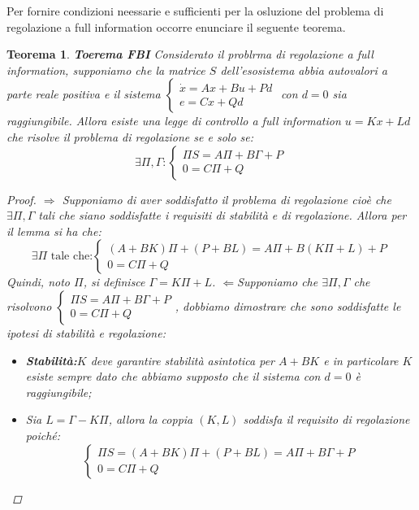 \documentclass{article}
\newtheorem{theorem}{\textbf{Teorema}}
\theoremstyle{definition}
\begin{document}
Per fornire condizioni neessarie e sufficienti per la osluzione del problema di regolazione a full information occorre enunciare il seguente teorema.
\begin{theorem}{\textbf{Toerema FBI}}
    Considerato il problrma di regolazione a full information, supponiamo che la matrice \(S\) dell'esosistema abbia autovalori a parte reale positiva e il sistema \(\begin{cases}
        \dot{x}=Ax+Bu+Pd \\
        e=Cx+Qd
    \end{cases}\) con \(d=0\) sia raggiungibile. Allora esiste una legge di controllo a full information \(u=Kx+Ld\) che risolve il problema di regolazione se e solo se:\begin{equation*}
        \exists \Pi,\Gamma:\begin{cases}
            \Pi S=A\Pi+B\Gamma+P\\
            0=C\Pi+Q
        \end{cases}
    \end{equation*}
    \begin{proof}
        \(\Rightarrow{} \) Supponiamo di aver soddisfatto il problema di regolazione cioè che \(\exists \Pi,\Gamma \) tali che siano soddisfatte i requisiti di stabilità e di regolazione. Allora per il lemma si ha che:\begin{equation*}
            \exists\Pi\text{  tale che:}\begin{cases}
                (A+BK)\Pi+(P+BL)=A\Pi+B(K\Pi+L)+P\\
                0=C\Pi+Q
            \end{cases}
        \end{equation*}
        Quindi, noto \(\Pi \), si definisce \(\Gamma=K\Pi+L\).\newline
        \(\Leftarrow \)Supponiamo che \(\exists\Pi,\Gamma \) che risolvono \(\begin{cases}
            \Pi S=A\Pi+B\Gamma+P\\
            0=C\Pi+Q
        \end{cases}\), dobbiamo dimostrare che sono soddisfatte le ipotesi di stabilità e regolazione:\begin{itemize}
            \item \textbf{Stabilità:}\(K\) deve garantire stabilità asintotica per \(A+BK\) e in particolare \(K\) esiste sempre dato che abbiamo supposto che il sistema con \(d=0\) è raggiungibile;
            \item Sia \(L=\Gamma-K\Pi \), allora la coppia \((K,L)\) soddisfa il requisito di regolazione poiché:\begin{equation*}
                \begin{cases}
                    \Pi S=(A+BK)\Pi+(P+BL)=A\Pi+B\Gamma+P\\
                    0=C\Pi+Q
                \end{cases}
            \end{equation*}
        \end{itemize}
    \end{proof}
\end{theorem}
\end{document}
